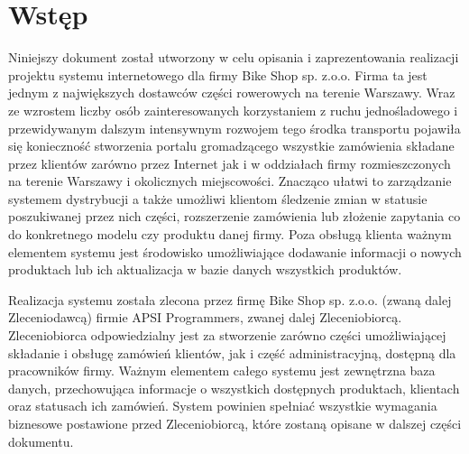 \section{Wstęp}

Niniejszy dokument został utworzony w celu opisania i
zaprezentowania realizacji projektu systemu internetowego dla firmy Bike
Shop sp. z.o.o. Firma ta jest jednym z największych dostawców części
rowerowych na terenie Warszawy. Wraz ze wzrostem liczby osób
zainteresowanych korzystaniem z ruchu jednośladowego i przewidywanym
dalszym intensywnym rozwojem tego środka transportu pojawiła się
konieczność stworzenia portalu gromadzącego wszystkie zamówienia
składane przez klientów zarówno przez Internet jak i w oddziałach firmy
rozmieszczonych na terenie Warszawy i okolicznych miejscowości.
Znacząco ułatwi to zarządzanie systemem dystrybucji a także umożliwi
klientom śledzenie zmian w statusie poszukiwanej przez nich części,
rozszerzenie zamówienia lub złożenie zapytania co do konkretnego
modelu czy produktu danej firmy. Poza obsługą klienta ważnym
elementem systemu jest środowisko umożliwiające dodawanie informacji
o nowych produktach lub ich aktualizacja w bazie danych wszystkich
produktów.

Realizacja systemu została zlecona przez firmę Bike Shop sp. z.o.o.
(zwaną dalej Zleceniodawcą) firmie APSI Programmers, zwanej dalej
Zleceniobiorcą. Zleceniobiorca odpowiedzialny jest za stworzenie zarówno
części umożliwiającej składanie i obsługę zamówień klientów, jak i
część administracyjną, dostępną dla pracowników firmy. Ważnym
elementem całego systemu jest zewnętrzna baza danych, przechowująca
informacje o wszystkich dostępnych produktach, klientach oraz statusach
ich zamówień.
System powinien spełniać wszystkie wymagania biznesowe postawione przed
Zleceniobiorcą, które zostaną opisane w dalszej części dokumentu.